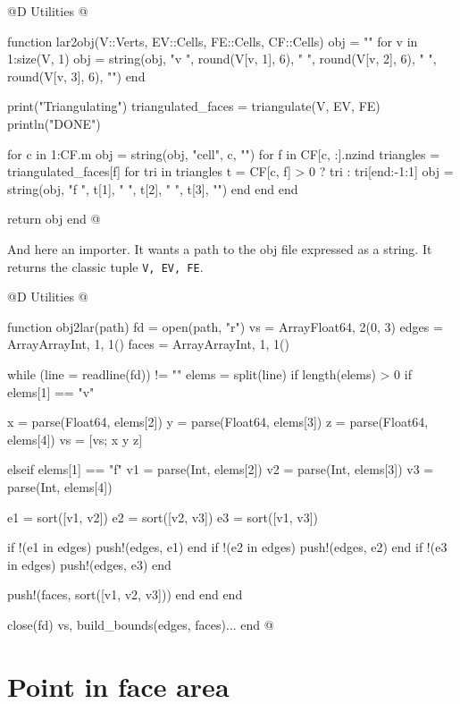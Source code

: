 @D Utilities
@{function lar2obj(V::Verts, EV::Cells, FE::Cells, CF::Cells)
    obj = ""
    for v in 1:size(V, 1)
        obj = string(obj, "v ", round(V[v, 1], 6), " ", round(V[v, 2], 6), " ", round(V[v, 3], 6), "\n")
    end

    print("Triangulating")
    triangulated_faces = triangulate(V, EV, FE)
    println("DONE")

    for c in 1:CF.m
        obj = string(obj, "\ng cell", c, "\n")
        for f in CF[c, :].nzind
            triangles = triangulated_faces[f]
            for tri in triangles
                t = CF[c, f] > 0 ? tri : tri[end:-1:1]
                obj = string(obj, "f ", t[1], " ", t[2], " ", t[3], "\n")
            end
        end
    end

    return obj
end
@}

And here an importer. It wants a path to the obj file
expressed as a string. It returns the classic tuple \texttt{V, EV, FE}.

@D Utilities
@{function obj2lar(path)
    fd = open(path, "r")
    vs = Array{Float64, 2}(0, 3)
    edges = Array{Array{Int, 1}, 1}()
    faces = Array{Array{Int, 1}, 1}()

    while (line = readline(fd)) != ""
        elems = split(line)
        if length(elems) > 0
            if elems[1] == "v"

                x = parse(Float64, elems[2])
                y = parse(Float64, elems[3])
                z = parse(Float64, elems[4])
                vs = [vs; x y z]

            elseif elems[1] == "f"
                v1 = parse(Int, elems[2])
                v2 = parse(Int, elems[3])
                v3 = parse(Int, elems[4])

                e1 = sort([v1, v2])
                e2 = sort([v2, v3])
                e3 = sort([v1, v3])

                if !(e1 in edges)
                    push!(edges, e1)
                end
                if !(e2 in edges)
                    push!(edges, e2)
                end
                if !(e3 in edges)
                    push!(edges, e3)
                end

                push!(faces, sort([v1, v2, v3]))
            end
        end
    end

    close(fd)
    vs, build_bounds(edges, faces)...
end  
@}


\section{Point in face area}
\label{sec:point_in_face}

